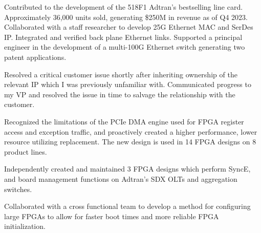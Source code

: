 \documentclass[10pt]{deedy-resume-reversed}
\begin{document}
\begin{minipage}[t]{1.0\textwidth}
\begin{tightemize}
\item Contributed to the development of the 518F1 Adtran’s bestselling line card. Approximately  36,000 units sold, generating \$250M in revenue as of Q4 2023. 
Collaborated with a staff researcher to develop 25G Ethernet MAC and SerDes IP.
Integrated and verified back plane Ethernet links.
Supported a principal engineer in the development of a multi-100G Ethernet switch generating two patent applications.
\item Resolved a critical customer issue shortly after inheriting ownership of the relevant IP which I was previously unfamiliar with. 
Communicated progress to my VP and resolved the issue in time to salvage the relationship with the customer.
\item Recognized the limitations of the PCIe DMA engine used for FPGA register access and exception traffic, 
and proactively created a higher performance, lower resource utilizing replacement. The new design is used in 14 FPGA designs on 8 product lines.
\item Independently created and maintained 3 FPGA designs which perform SyncE, and board management functions on Adtran's SDX OLTs and aggregation switches. 
\item Collaborated with a cross functional team to develop a method for configuring large FPGAs to allow for faster boot times and more reliable FPGA initialization.
\end{tightemize}
\sectionsep


\end{minipage}
\end{document}
